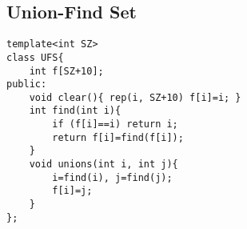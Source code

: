 \subsection{Union-Find Set}
\begin{lstlisting}
template<int SZ>
class UFS{
    int f[SZ+10];
public:
    void clear(){ rep(i, SZ+10) f[i]=i; }
    int find(int i){
        if (f[i]==i) return i;
        return f[i]=find(f[i]);
    }
    void unions(int i, int j){
        i=find(i), j=find(j);
        f[i]=j;
    }
};
\end{lstlisting}
